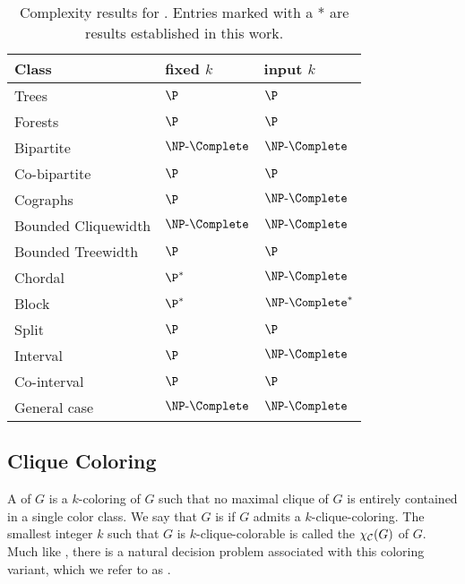 \begin{table}[!htb]
    \centering
    \begin{tabular}{l|l|l}
       \hline
       \hline
       Class               &  fixed $k$         & input $k$             \\
       \hline
       Trees                &  $\P$             & $\P$                  \\
       Forests              &  $\P$             & $\P$                  \\
       Bipartite            &  $\NPc$           & $\NPc$                \\
       Co-bipartite         &  $\P$             & $\P$                  \\
       Cographs             &  $\P$             & $\NPc$                \\
       Bounded Cliquewidth  &  $\NPc$                & $\NPc$                \\
       Bounded Treewidth    &  $\P$             & $\P$                  \\
       Chordal              &  $\P^*$           & $\NPc$                \\
       Block                &  $\P^*$           & $\NPc^*$              \\
       Split                &  $\P$             & $\P$                  \\
       Interval             &  $\P$             & $\NPc$                \\
       Co-interval          &  $\P$             & $\P$                  \\
       General case         &  $\NPc$           & $\NPc$                \\
       \hline
       \hline
    \end{tabular}
    \caption{Complexity results for . Entries marked with a * are results established in this work.}
    \label{tab:equitable_complexity}
\end{table}

\subsection{Clique Coloring}
A  of $G$ is a $k$-coloring of $G$ such that no maximal clique of $G$ is entirely contained in a single color class.
We say that $G$ is  if $G$ admits a $k$-clique-coloring.
The smallest integer $k$ such that $G$ is $k$-clique-colorable is called the  $\chi_{\mathcal{C}}(G)$ of $G$.
Much like , there is a natural decision problem associated with this coloring variant, which we refer to as .


